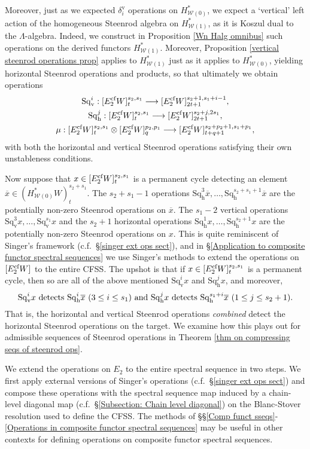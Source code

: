 \documentclass[11pt]{amsart} \renewcommand{\baselinestretch}{1.2}
\theoremstyle{plain}
\numberwithin{equation}{section} %
\theoremstyle{plain}
\numberwithin{equation}{chapter} %
\renewcommand{\to}{\longrightarrow}
\newcommand{\calw}{\mathcal{W}}
\newcommand{\E}[5]{[E^{#1}_{#2}#3]^{#4}_{#5}}
\newcommand{\uver}{^\mathrm{v}}
\newcommand{\dver}{_\mathrm{v}}
\newcommand{\dhor}{_\mathrm{h}}
\newcommand{\Sqh}{\mathrm{Sq}\dhor}
\newcommand{\Sqv}{\mathrm{Sq}\dver}
\newcommand{\deltav}{\delta\uver}
\newcommand{\CFSS}{CFSS}
\begin{document}
\begin{Introduction}
Moreover, just as we expected $\deltav_i$ operations on $H^*_{\calw(0)}$, we expect a `vertical' left action of the homogeneous Steenrod algebra on $H^*_{\calw(1)}$, as it is Koszul dual to the $\Lambda$-algebra. Indeed, we construct in Proposition \ref{Wn Halg omnibus} such operations on the derived functors $H^*_{\calw(1)}$. Moreover,
Proposition \ref{vertical steenrod operations prop} applies to $H^*_{\calw(1)}$ just as it applies to $H^*_{\calw(0)}$, yielding horizontal Steenrod operations and products, so that ultimately we obtain operations
\begin{gather*}
\Sqv^i:\E{\textup{cf}}{2}{W}{s_{2},s_1}t\to \E{\textup{cf}}{2}{W}{s_2+1,s_1+i-1}{2t+1},\\
\Sqh^j:\E{\textup{cf}}{2}{W}{s_2,s_1}{t}\to \E{\textup{cf}}{2}{W}{s_{2}+j,2s_1}{2t+1},\\
\mu:\E{\textup{cf}}{2}{W}{s_2,s_1}{t}\otimes \E{\textup{cf}}{2}{W}{p_2,p_1}{q}\to \E{\textup{cf}}{2}{W}{s_2+p_2+1,s_1+p_1}{t+q+1},
\end{gather*}
with both the horizontal and vertical Steenrod operations satisfying their own unstableness conditions.

Now suppose that $x\in \E{\textup{cf}}{2}{W}{s_{2},s_1}{t}$ is a permanent cycle detecting an element $\overline{x}\in (H^*_{\calw(0)}W)^{s_2+s_1}_t$. The $s_2{+}s_1{-}1$ operations $\Sqh^3\overline{x},\ldots,\Sqh^{s_2+s_1+1}\overline{x}$ are the potentially non-zero Steenrod operations on $\overline{x}$. The $s_1{-}2$ vertical operations $\Sqv^3x,\ldots,\Sqv^{s_1}x$ and the $s_2{+}1$ horizontal operations $\Sqh^1x,\ldots,\Sqh^{s_2+1}x$ are the potentially non-zero  Steenrod operations on $x$.
This is quite reminiscent of Singer's framework \cite{MR2245560} (c.f.\ \S\ref{singer ext ops sect}), and in \S\ref{Application to composite functor spectral sequences} we use Singer's methods  to extend the operations on $\E{\textup{cf}}{2}{W}{}{}$ to the entire \CFSS. The upshot is that if $x\in \E{\textup{cf}}{2}{W}{s_{2},s_1}{t}$ is a permanent cycle, then so are all of the above mentioned $\Sqv^ix$ and $\Sqh^jx$, and moreover,
\[\Sqv^ix\textup{ detects }\Sqh^i\overline{x}\ (3\leq i\leq s_1)\textup{ and }\Sqh^jx\textup{ detects }\Sqh^{s_1+i}\overline{x}\ (1\leq j\leq s_2+1).\]
That is, the horizontal and vertical Steenrod operations \emph{combined} detect the horizontal Steenrod operations on the target. We examine how this plays out for admissible sequences of Steenrod operations in Theorem \ref{thm on compressing seqs of steenrod ops}.

We extend the operations on $E_2$ to the entire spectral sequence in two steps. We first apply external versions of Singer's operations (c.f.\ \S\ref{singer ext ops sect}) and compose these operations with the spectral sequence map induced by a chain-level diagonal map (c.f.\ \S\ref{Subsection: Chain level diagonal}) on the Blanc-Stover resolution \cite{Blanc_Stover-Groth_SS.pdf} used to define the \CFSS. The methods of \S\S\ref{Comp funct sseqs}-\ref{Operations in composite functor spectral sequences} may be useful in other contexts for defining operations on composite functor spectral sequences.


\end{Introduction}
\end{document}
